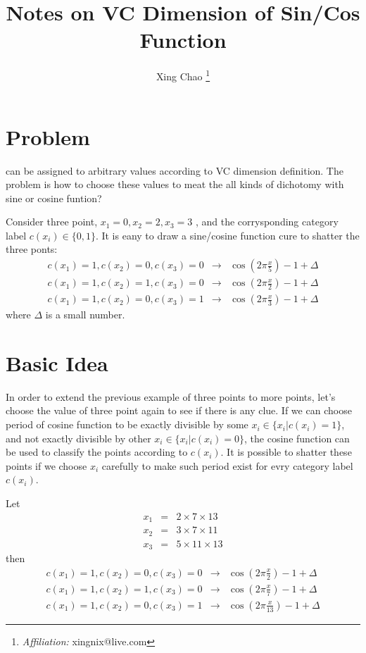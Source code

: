\documentclass{article}
\newcommand{\tmaffiliation}[1]{\thanks{\textit{Affiliation:} #1}}
\begin{document}
\title{Notes on VC Dimension of Sin/Cos Function}

\author{
  Xing Chao
  \tmaffiliation{xingnix@live.com}
}

\maketitle

\section{Problem}

can be assigned to arbitrary values according to VC dimension definition. The
problem is how to choose these values to meat the all kinds of dichotomy with
sine or cosine funtion?

Consider three point, $x_{1} =0,x_{2} =2,x_{3} =3$ , and the corrysponding
category label $c ( x_{i} ) \in \{ 0,1 \}$. It is eany to draw a sine/cosine
function cure to shatter the three ponts:
\begin{eqnarray*}
  c ( x_{1} ) =1,c ( x_{2} ) =0,c ( x_{3} ) =0 & \rightarrow & \cos \left( 2
  \pi   \frac{x}{5} \right) -1+ \Delta\\
  c ( x_{1} ) =1,c ( x_{2} ) =1,c ( x_{3} ) =0 & \rightarrow & \cos \left( 2
  \pi   \frac{x}{2} \right) -1+ \Delta\\
  c ( x_{1} ) =1,c ( x_{2} ) =0,c ( x_{3} ) =1 & \rightarrow & \cos \left( 2
  \pi   \frac{x}{3} \right) -1+ \Delta
\end{eqnarray*}
where $\Delta$ is a small number.

\section{Basic Idea}

In order to extend the previous example of three points to more points, let's
choose the value of three point again to see if there is any clue. If we can
choose period of cosine function to be exactly divisible by some $x_{i} \in \{
x_{i} |c ( x_{i} ) =1 \}$, and not exactly divisible by other $x_{i} \in \{
x_{i} |c ( x_{i} ) =0 \}$, the cosine function can be used to classify the
points according to $c ( x_{i} )$. It is possible to shatter these points if
we choose $x_{i}$ carefully to make such period exist for evry category label
$c ( x_{i} )$.

Let
\begin{eqnarray*}
  x_{1} & = & 2 \times 7 \times 13\\
  x_{2} & = & 3 \times 7 \times 11\\
  x_{3} & = & 5 \times 11 \times 13
\end{eqnarray*}
then
\begin{eqnarray*}
  c ( x_{1} ) =1,c ( x_{2} ) =0,c ( x_{3} ) =0 & \rightarrow & \cos \left( 2
  \pi   \frac{x}{2} \right) -1+ \Delta\\
  c ( x_{1} ) =1,c ( x_{2} ) =1,c ( x_{3} ) =0 & \rightarrow & \cos \left( 2
  \pi   \frac{x}{7} \right) -1+ \Delta\\
  c ( x_{1} ) =1,c ( x_{2} ) =0,c ( x_{3} ) =1 & \rightarrow & \cos \left( 2
  \pi   \frac{x}{13} \right) -1+ \Delta
\end{eqnarray*}
\end{document}
